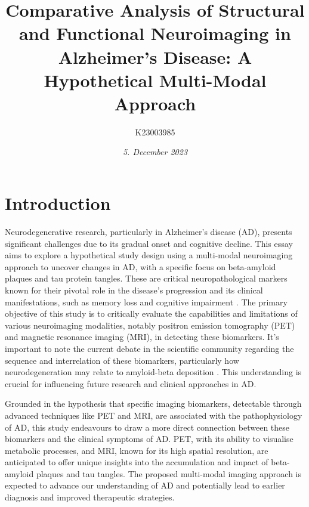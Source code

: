 \documentclass[10pt]{article}
\title{\textbf{Comparative Analysis of Structural and Functional Neuroimaging in Alzheimer’s Disease: }A Hypothetical Multi-Modal Approach}
\author[ ]{K23003985}
\date{\textit{5. December 2023}}
\begin{document}

\maketitle

\doublespacing

\begin{sloppypar} %





  \section{Introduction}
  \label{sec:introduction}

  Neurodegenerative research, particularly in Alzheimer’s disease (AD), presents significant challenges due to its gradual onset and cognitive decline. This essay aims to explore a hypothetical study design using a multi-modal neuroimaging approach to uncover changes in AD, with a specific focus on beta-amyloid plaques and tau protein tangles. These are critical neuropathological markers known for their pivotal role in the disease’s progression and its clinical manifestations, such as memory loss and cognitive impairment \citep{heneka_neuroinflammation_2015,marttinen_molecular_2018}. The primary objective of this study is to critically evaluate the capabilities and limitations of various neuroimaging modalities, notably positron emission tomography (PET) and magnetic resonance imaging (MRI), in detecting these biomarkers. It's important to note the current debate in the scientific community regarding the sequence and interrelation of these biomarkers, particularly how neurodegeneration may relate to amyloid-beta deposition \citep{besson_cognitive_2015}. This understanding is crucial for influencing future research and clinical approaches in AD.

  Grounded in the hypothesis that specific imaging biomarkers, detectable through advanced techniques like PET and MRI, are associated with the pathophysiology of AD, this study endeavours to draw a more direct connection between these biomarkers and the clinical symptoms of AD. PET, with its ability to visualise metabolic processes, and MRI, known for its high spatial resolution, are anticipated to offer unique insights into the accumulation and impact of beta-amyloid plaques and tau tangles. The proposed multi-modal imaging approach is expected to advance our understanding of AD and potentially lead to earlier diagnosis and improved therapeutic strategies.


\end{sloppypar}
\end{document}

